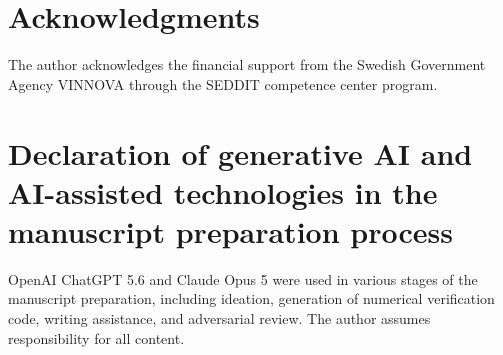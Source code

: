 \documentclass[final,5p,times,twocolumn]{elsarticle}
\begin{document}
\section*{Acknowledgments}
The author acknowledges the financial support from the Swedish Government Agency VINNOVA through the SEDDIT competence center program.

\section*{Declaration of generative AI and AI-assisted technologies
in the manuscript preparation process}
OpenAI ChatGPT 5.6 and Claude Opus 5 were used in various stages of the manuscript preparation, including ideation, generation of numerical verification code, writing assistance, and adversarial review. The author assumes responsibility for all content.



\end{document}
